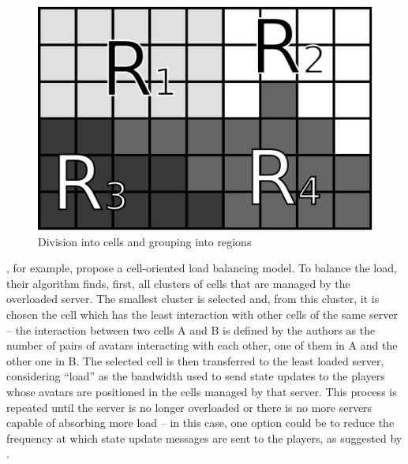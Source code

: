 \documentclass[acmtocl]{acmtrans2m}
\begin{document}
\begin{figure}[!t]
	\centering
	\includegraphics[width=0.85\linewidth]{images/macromicro}
	\caption{Division into cells and grouping into regions}
	\label{fig:cells}
\end{figure}

\cite{ahmed2008mol}, for example, propose a cell-oriented load balancing model. To balance the load, their algorithm finds, first, all clusters of cells that are managed by the overloaded server. The smallest cluster is selected and, from this cluster, it is chosen the cell which has the least interaction with other cells of the same server -- the interaction between two cells A and B is defined by the authors as the number of pairs of avatars interacting with each other, one of them in A and the other one in B. The selected cell is then transferred to the least loaded server, considering ``load'' as the bandwidth used to send state updates to the players whose avatars are positioned in the cells managed by that server. This process is repeated until the server is no longer overloaded or there is no more servers capable of absorbing more load -- in this case, one option could be to reduce the frequency at which state update messages are sent to the players, as suggested by \cite{bezerra2008a3}.
\end{document}
